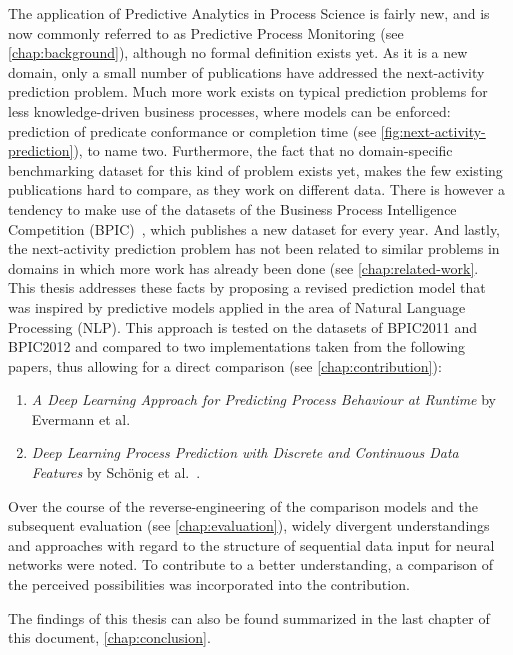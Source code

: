 The application of Predictive Analytics in Process Science is fairly new, and is now commonly referred to as Predictive Process Monitoring (see \autoref{chap:background}), although no formal definition exists yet. As it is a new domain, only a small number of publications have addressed the next-activity prediction problem. Much more work exists on typical prediction problems for less knowledge-driven business processes, where models can be enforced: prediction of predicate conformance or completion time (see \autoref{fig:next-activity-prediction}), to name two. Furthermore, the fact that no domain-specific benchmarking dataset for this kind of problem exists yet, makes the few existing publications hard to compare, as they work on different data. There is however a tendency to make use of the datasets of the Business Process Intelligence Competition (BPIC)~\cite{BPIC2011, BPIC2012, BPIC2017}, which publishes a new dataset for every year. And lastly, the next-activity prediction problem has not been related to similar problems in domains in which more work has already been done (see \autoref{chap:related-work}.\\

This thesis addresses these facts by proposing a revised prediction model that was inspired by predictive models applied in the area of Natural Language Processing (NLP). This approach is tested on the datasets of BPIC2011 and BPIC2012 and compared to two implementations taken from the following papers, thus allowing for a direct comparison (see \autoref{chap:contribution}):

\begin{enumerate}
    \item \textit{A Deep Learning Approach for Predicting Process Behaviour at Runtime} by Evermann et al.~\cite{evermann2016} \item\textit{Deep Learning Process Prediction with Discrete and Continuous Data Features} by Schönig et al.~\cite{schoenig2018}.
\end{enumerate}

Over the course of the reverse-engineering of the comparison models and the subsequent evaluation (see \autoref{chap:evaluation}), widely divergent understandings and approaches with regard to the structure of sequential data input for neural networks were noted. To contribute to a better understanding, a comparison of the perceived possibilities was incorporated into the contribution.

The findings of this thesis can also be found summarized in the last chapter of this document, \autoref{chap:conclusion}.

